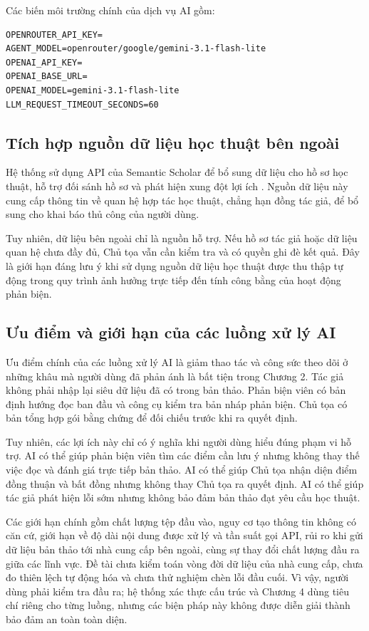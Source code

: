 Các biến môi trường chính của dịch vụ AI gồm:

\begin{lstlisting}
OPENROUTER_API_KEY=
AGENT_MODEL=openrouter/google/gemini-3.1-flash-lite
OPENAI_API_KEY=
OPENAI_BASE_URL=
OPENAI_MODEL=gemini-3.1-flash-lite
LLM_REQUEST_TIMEOUT_SECONDS=60
\end{lstlisting}

\subsection{Tích hợp nguồn dữ liệu học thuật bên ngoài}

Hệ thống sử dụng API của Semantic Scholar để bổ sung dữ liệu cho hồ sơ học thuật, hỗ trợ đối sánh hồ sơ và phát hiện xung đột lợi ích \cite{ch3ref16}. Nguồn dữ liệu này cung cấp thông tin về quan hệ hợp tác học thuật, chẳng hạn đồng tác giả, để bổ sung cho khai báo thủ công của người dùng.

Tuy nhiên, dữ liệu bên ngoài chỉ là nguồn hỗ trợ. Nếu hồ sơ tác giả hoặc dữ liệu quan hệ chưa đầy đủ, Chủ tọa vẫn cần kiểm tra và có quyền ghi đè kết quả. Đây là giới hạn đáng lưu ý khi sử dụng nguồn dữ liệu học thuật được thu thập tự động trong quy trình ảnh hưởng trực tiếp đến tính công bằng của hoạt động phản biện.

\subsection{Ưu điểm và giới hạn của các luồng xử lý AI}

Ưu điểm chính của các luồng xử lý AI là giảm thao tác và công sức theo dõi ở những khâu mà người dùng đã phản ánh là bất tiện trong Chương 2. Tác giả không phải nhập lại siêu dữ liệu đã có trong bản thảo. Phản biện viên có bản định hướng đọc ban đầu và công cụ kiểm tra bản nháp phản biện. Chủ tọa có bản tổng hợp gói bằng chứng để đối chiếu trước khi ra quyết định.

Tuy nhiên, các lợi ích này chỉ có ý nghĩa khi người dùng hiểu đúng phạm vi hỗ trợ. AI có thể giúp phản biện viên tìm các điểm cần lưu ý nhưng không thay thế việc đọc và đánh giá trực tiếp bản thảo. AI có thể giúp Chủ tọa nhận diện điểm đồng thuận và bất đồng nhưng không thay Chủ tọa ra quyết định. AI có thể giúp tác giả phát hiện lỗi sớm nhưng không bảo đảm bản thảo đạt yêu cầu học thuật.

Các giới hạn chính gồm chất lượng tệp đầu vào, nguy cơ tạo thông tin không có căn cứ, giới hạn về độ dài nội dung được xử lý và tần suất gọi API, rủi ro khi gửi dữ liệu bản thảo tới nhà cung cấp bên ngoài, cùng sự thay đổi chất lượng đầu ra giữa các lĩnh vực. Đề tài chưa kiểm toán vòng đời dữ liệu của nhà cung cấp, chưa đo thiên lệch tự động hóa và chưa thử nghiệm chèn lỗi đầu cuối. Vì vậy, người dùng phải kiểm tra đầu ra; hệ thống xác thực cấu trúc và Chương 4 dùng tiêu chí riêng cho từng luồng, nhưng các biện pháp này không được diễn giải thành bảo đảm an toàn toàn diện.

